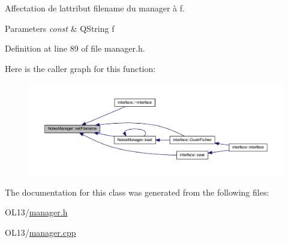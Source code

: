 Affectation de l\textquotesingle{}attribut filename du manager à f. 


\begin{DoxyParams}{Parameters}
{\em const} & Q\+String f \\
\hline
\end{DoxyParams}


Definition at line 89 of file manager.\+h.

Here is the caller graph for this function\+:\nopagebreak
\begin{figure}[H]
\begin{center}
\leavevmode
\includegraphics[width=350pt]{class_notes_manager_a797d858176de3f5e64aa8194797909fb_icgraph}
\end{center}
\end{figure}


The documentation for this class was generated from the following files\+:\begin{DoxyCompactItemize}
\item 
O\+L13/\hyperlink{manager_8h}{manager.\+h}\item 
O\+L13/\hyperlink{manager_8cpp}{manager.\+cpp}\end{DoxyCompactItemize}
